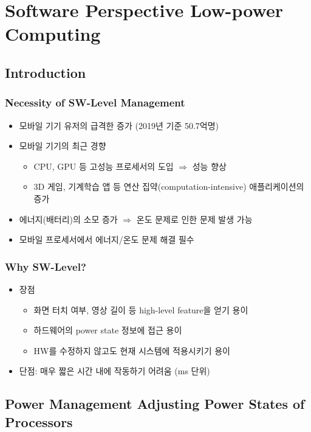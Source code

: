 \section{Software Perspective Low-power Computing}

\subsection{Introduction}

\subsubsection*{Necessity of SW-Level Management}
\begin{itemize}
    \item 모바일 기기 유저의 급격한 증가 (2019년 기준 50.7억명)
    \item 모바일 기기의 최근 경향
    \begin{itemize}
        \item CPU, GPU 등 고성능 프로세서의 도입 $\Rightarrow$ 성능 향상
        \item 3D 게임, 기계학습 앱 등 연산 집약(computation-intensive) 애플리케이션의 증가
    \end{itemize}
    \item 에너지(배터리)의 소모 증가 $\Rightarrow$ 온도 문제로 인한 문제 발생 가능
    \item 모바일 프로세서에서 에너지/온도 문제 해결 필수
\end{itemize}

\subsubsection*{Why SW-Level?}
\begin{itemize}
    \item 장점
    \begin{itemize}
        \item 화면 터치 여부, 영상 길이 등 high-level feature을 얻기 용이
        \item 하드웨어의 power state 정보에 접근 용이
        \item HW를 수정하지 않고도 현재 시스템에 적용시키기 용이
    \end{itemize}
    \item 단점: 매우 짧은 시간 내에 작동하기 어려움 (ms 단위)
\end{itemize}

\subsection{Power Management Adjusting Power States of Processors}

